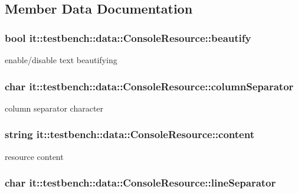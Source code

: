 \subsection{Member Data Documentation}
\hypertarget{structit_1_1testbench_1_1data_1_1ConsoleResource_a79ece7f3ba43fd61b1988082bd305a18}{
\subsubsection[{beautify}]{\setlength{\rightskip}{0pt plus 5cm}bool it\-::testbench\-::data\-::\-Console\-Resource\-::beautify}}\label{de/d9c/structit_1_1testbench_1_1data_1_1ConsoleResource_a79ece7f3ba43fd61b1988082bd305a18}
enable/disable text beautifying \hypertarget{structit_1_1testbench_1_1data_1_1ConsoleResource_a15e4f2259df5082ace7db28fb8b990b7}{
\subsubsection[{column\-Separator}]{\setlength{\rightskip}{0pt plus 5cm}char it\-::testbench\-::data\-::\-Console\-Resource\-::column\-Separator}}\label{de/d9c/structit_1_1testbench_1_1data_1_1ConsoleResource_a15e4f2259df5082ace7db28fb8b990b7}
column separator character \hypertarget{structit_1_1testbench_1_1data_1_1ConsoleResource_a61b707de1ba1f3a875107306b9e17a44}{
\subsubsection[{content}]{\setlength{\rightskip}{0pt plus 5cm}string it\-::testbench\-::data\-::\-Console\-Resource\-::content}}\label{de/d9c/structit_1_1testbench_1_1data_1_1ConsoleResource_a61b707de1ba1f3a875107306b9e17a44}
resource content \hypertarget{structit_1_1testbench_1_1data_1_1ConsoleResource_a7272ac634ee6d69c0159dbf4c71fab95}{
\subsubsection[{line\-Separator}]{\setlength{\rightskip}{0pt plus 5cm}char it\-::testbench\-::data\-::\-Console\-Resource\-::line\-Separator}}\label{de/d9c/structit_1_1testbench_1_1data_1_1ConsoleResource_a7272ac634ee6d69c0159dbf4c71fab95}
